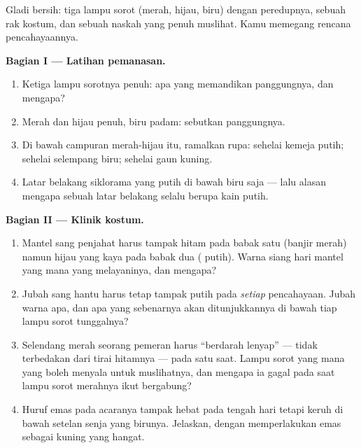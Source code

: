 \begin{problem}\label{pb:g8:colors-spectra:1}
Gladi bersih: tiga lampu sorot (merah, hijau, biru) dengan peredupnya,
sebuah rak kostum, dan sebuah naskah yang penuh muslihat. Kamu
memegang rencana pencahayaannya.

\medskip\noindent\textbf{Bagian I --- Latihan pemanasan.}
\begin{enumerate}
  \item Ketiga lampu sorotnya penuh:  apa yang memandikan
        panggungnya, dan mengapa?
  \item Merah dan hijau penuh, biru padam: sebutkan 
        panggungnya.
  \item Di bawah campuran merah-hijau itu, ramalkan rupa: sehelai
        kemeja putih; sehelai selempang biru; sehelai gaun kuning.
  \item Latar belakang siklorama yang putih di bawah biru saja ---
        lalu alasan mengapa sebuah latar belakang selalu berupa kain
        putih.
\end{enumerate}

\medskip\noindent\textbf{Bagian II --- Klinik kostum.}
\begin{enumerate}[resume]
  \item Mantel sang penjahat harus tampak hitam pada babak satu
        (banjir merah) namun hijau yang kaya pada babak dua (
        putih). Warna siang hari mantel yang mana yang melayaninya,
        dan mengapa?
  \item Jubah sang hantu harus tetap tampak putih pada \emph{setiap}
        pencahayaan. Jubah warna apa, dan apa yang sebenarnya akan
        ditunjukkannya di bawah tiap lampu sorot tunggalnya?
  \item Selendang merah seorang pemeran harus ``berdarah lenyap'' ---
        tidak terbedakan dari tirai hitamnya --- pada satu saat.
        Lampu sorot yang mana yang boleh menyala untuk muslihatnya,
        dan mengapa ia gagal pada saat lampu sorot merahnya ikut
        bergabung?
  \item Huruf emas pada acaranya tampak hebat pada tengah hari tetapi
        keruh di bawah setelan senja yang  birunya. Jelaskan,
        dengan memperlakukan emas sebagai kuning yang hangat.
\end{enumerate}


\end{problem}

